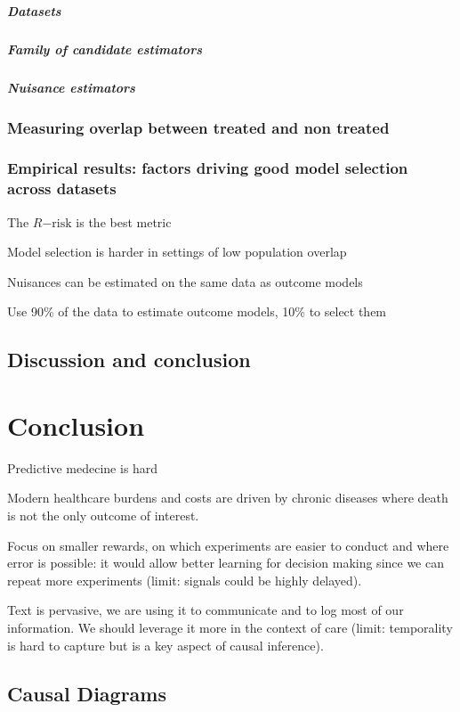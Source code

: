 \documentclass{report}
\begin{document}
\paragraph{Datasets}
\paragraph{Family of candidate estimators}
\paragraph{Nuisance estimators}

\subsection{Measuring overlap between treated and non treated}\label{subsec:causal_model_selection:overlap}

\subsection{Empirical results: factors driving good model selection across
  datasets}\label{subsec:causal_model_selection:empirical_results}


The $R\mathrm{-risk}$ is the best metric

Model selection is harder in settings of low population overlap

Nuisances can be estimated on the same data as outcome
models

Use 90\% of the data to estimate outcome models, 10\% to select them

\section{Discussion and conclusion}\label{sec:causal_model_selection:discussion}


\chapter{Conclusion}\label{chapter:conclusion}

Predictive medecine is hard

Modern healthcare burdens and costs are driven by chronic diseases where death
is not the only outcome of interest.

Focus on smaller rewards, on which experiments are easier to conduct and where
error is possible: it would allow better learning for decision making since we
can repeat more experiments (limit: signals could be highly delayed).

Text is pervasive, we are using it to communicate and to log most of our
information. We should leverage it more in the context of care (limit:
temporality is hard to capture but is a key aspect of causal inference).


\printbibliography

\appendix

\clearpage

\section{Causal Diagrams}
\end{document}
